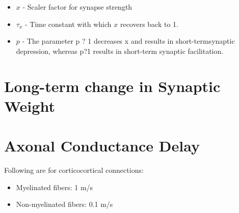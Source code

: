 \documentclass{article}
\begin{document}
\begin{itemize}
	\item $x$ - Scaler factor for synapse strength
	\item $\tau_x$ - Time constant with which $x$ recovers back to 1.
	\item $p$ - The parameter p ? 1 decreases x and results in short-termsynaptic depression, whereas p?1 results in short-term synaptic facilitation.
\end{itemize}

\section{Long-term change in Synaptic Weight}

\section{Axonal Conductance Delay}
Following are for corticocortical connections:
\begin{itemize}
	\item Myelinated fibers: 1 m/s
	\item Non-myelinated fibers: 0.1 m/s
\end{itemize}


\newpage



\end{document}
